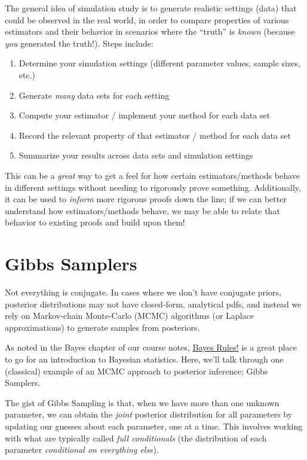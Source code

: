 \documentclass[
  letterpaper,
  DIV=11,
  numbers=noendperiod]{scrreprt}
\begin{document}
The general idea of simulation study is to generate realistic settings
(data) that could be observed in the real world, in order to compare
properties of various estimators and their behavior in scenarios where
the ``truth'' is \emph{known} (because \emph{you} generated the truth!).
Steps include:

\begin{enumerate}
\def\labelenumi{\arabic{enumi}.}
\item
  Determine your simulation settings (different parameter values, sample
  sizes, etc.)
\item
  Generate \emph{many} data sets for each setting
\item
  Compute your estimator / implement your method for each data set
\item
  Record the relevant property of that estimator / method for each data
  set
\item
  Summarize your results across data sets and simulation settings
\end{enumerate}

This can be a \emph{great} way to get a feel for how certain
estimators/methods behave in different settings without needing to
rigorously prove something. Additionally, it can be used to
\emph{inform} more rigorous proofs down the line; if we can better
understand how estimators/methods behave, we may be able to relate that
behavior to existing proofs and build upon them!

\section{Gibbs Samplers}\label{gibbs-samplers}

Not everything is conjugate. In cases where we don't have conjugate
priors, posterior distributions may not have closed-form, analytical
pdfs, and instead we rely on Markov-chain Monte-Carlo (MCMC) algorithms
(or Laplace approximations) to generate samples from posteriors.

As noted in the Bayes chapter of our course notes,
\href{https://www.bayesrulesbook.com/}{Bayes Rules!} is a great place to
go for an introduction to Bayesian statistics. Here, we'll talk through
one (classical) example of an MCMC approach to posterior inference;
Gibbs Samplers.

The gist of Gibbs Sampling is that, when we have more than one unknown
parameter, we can obtain the \emph{joint} posterior distribution for all
parameters by updating our guesses about each parameter, one at a time.
This involves working with what are typically called \emph{full
conditionals} (the distribution of each parameter \emph{conditional on
everything else}).
\end{document}
